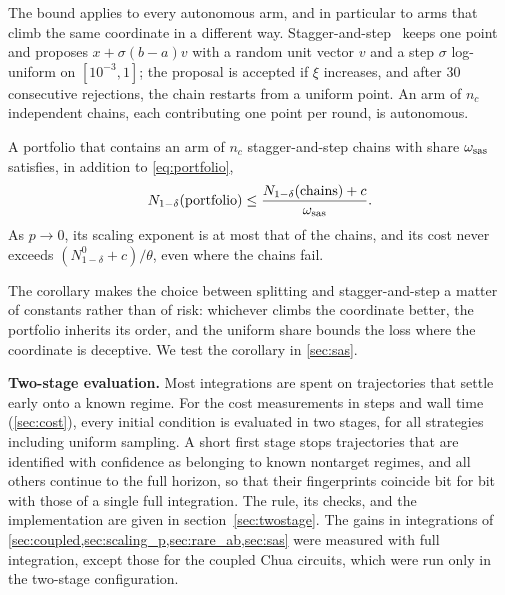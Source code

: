 The bound applies to every autonomous arm, and in particular to arms that climb the same coordinate in a different way. Stagger-and-step~\cite{SweetNusseYorke2001} keeps one point and proposes $x+\sigma(b-a)v$ with a random unit vector $v$ and a step $\sigma$ log-uniform on $[10^{-3},1]$; the proposal is accepted if $\xi$ increases, and after 30 consecutive rejections, the chain restarts from a uniform point. An arm of $n_c$ independent chains, each contributing one point per round, is autonomous.

\begin{corollary}\label{cor:sas}
A portfolio that contains an arm of $n_c$ stagger-and-step chains with share $\omega_{\rm sas}$ satisfies, in addition to \eqref{eq:portfolio},
\begin{equation*}
N_{1-\delta}(\text{portfolio})\le\frac{N_{1-\delta}(\text{chains})+c}{\omega_{\rm sas}}.
\end{equation*}
As $p\to0$, its scaling exponent is at most that of the chains, and its cost never exceeds $(N^0_{1-\delta}+c)/\theta$, even where the chains fail.
\end{corollary}

The corollary makes the choice between splitting and stagger-and-step a matter of constants rather than of risk: whichever climbs the coordinate better, the portfolio inherits its order, and the uniform share bounds the loss where the coordinate is deceptive. We test the corollary in \cref{sec:sas}.

\textbf{Two-stage evaluation.} Most integrations are spent on trajectories that settle early onto a known regime. For the cost measurements in steps and wall time (\cref{sec:cost}), every initial condition is evaluated in two stages, for all strategies including uniform sampling. A short first stage stops trajectories that are identified with confidence as belonging to known nontarget regimes, and all others continue to the full horizon, so that their fingerprints coincide bit for bit with those of a single full integration. The rule, its checks, and the implementation are given in section~\ref{sec:twostage}. The gains in integrations of \cref{sec:coupled,sec:scaling_p,sec:rare_ab,sec:sas} were measured with full integration, except those for the coupled Chua circuits, which were run only in the two-stage configuration.
